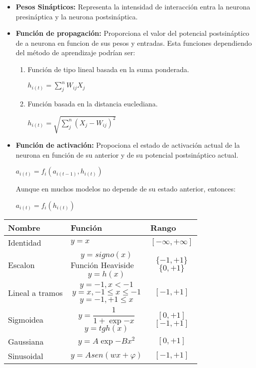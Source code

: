 \documentclass[journal]{IEEEtran}
\begin{document}
\begin{enumerate}
\begin{itemize}
\item \textbf{Pesos Sinápticos:} Representa la intensidad de interacción entra la neurona presináptica y la neurona postsináptica.\\
    		
\item \textbf{Función de propagación:} Proporciona el valor del potencial postsináptico de a neurona en funcion de sus pesos y entradas. Esta funciones dependiendo del método de aprendizaje podrían ser:
\begin{enumerate}
\item Función de tipo lineal basada en la suma ponderada.	
\begin{center}
$ h_{i(t)} = \sum_{j}^{n}W_{ij}X_{j}$
\end{center}
        		
\item Función basada en la distancia euclediana.	
\begin{center}
$ h_{i(t)} = \sqrt{\sum_{j}^{n}(X_{j}-W_{ij})^2}$
\end{center}
\end{enumerate}
        
\item \textbf{Función de activación:} 
Propociona el estado de activación actual de la neurona en función de su anterior y de su potencial postsináptico actual.

\begin{center}
$ a_{i(t)} = f_{i}(a_{i(t-1)},h_{i(t)})$
\end{center}
        		
Aunque en muchos modelos no depende de su estado anterior, entonces:

\begin{center}
$ a_{i(t)} = f_{i}(h_{i(t)})$
\end{center}

\end{itemize}
\end{enumerate}

\begin{center}
\centering
\begin{tabular}{ | l | p{30mm} | p{15mm} | }
\hline
Nombre & Función & Rango \\ \hline\hline
Identidad & $y=x$ & $[-\infty,+\infty]$  \\ \hline
Escalon & $$y=signo(x)$$Función Heaviside$$y =h(x)$$ & $$\{-1,+1\}$$ $$\{0,+1\}$$ \\ \hline
Lineal a tramos & $$y=-1, x<-1$$ $$y=x, -1 \leq x \leq -1$$ $$y=-1, +1 \leq x$$ & $$[-1,+1]$$ \\ \hline
Sigmoidea & $$y=\frac{1}{1+\exp{-x}}$$ $$y=tgh(x)$$ & $$[0,+1]$$ $$[-1,+1]$$ \\ \hline
Gaussiana & $$y=A \exp{-Bx^2}$$ & $$[0,+1]$$ \\ \hline
Sinusoidal & $$y=Asen(wx + \varphi)$$ & $$[-1,+1]$$ \\ \hline
\end{tabular}
\end{center}
  
\end{document}
